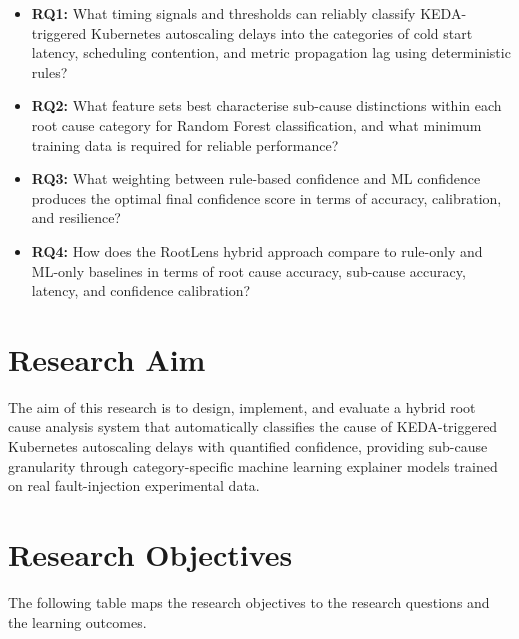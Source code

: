 \begin{itemize}
    \item \textbf{RQ1:} What timing signals and thresholds can reliably classify KEDA-triggered Kubernetes autoscaling delays into the categories of cold start latency, scheduling contention, and metric propagation lag using deterministic rules?
    \item \textbf{RQ2:} What feature sets best characterise sub-cause distinctions within each root cause category for Random Forest classification, and what minimum training data is required for reliable performance?
    \item \textbf{RQ3:} What weighting between rule-based confidence and ML confidence produces the optimal final confidence score in terms of accuracy, calibration, and resilience?
    \item \textbf{RQ4:} How does the RootLens hybrid approach compare to rule-only and ML-only baselines in terms of root cause accuracy, sub-cause accuracy, latency, and confidence calibration?
\end{itemize}

\section{Research Aim}
The aim of this research is to design, implement, and evaluate a hybrid root cause analysis system that automatically classifies the cause of KEDA-triggered Kubernetes autoscaling delays with quantified confidence, providing sub-cause granularity through category-specific machine learning explainer models trained on real fault-injection experimental data.

\section{Research Objectives}
The following table maps the research objectives to the research questions and the learning outcomes.

